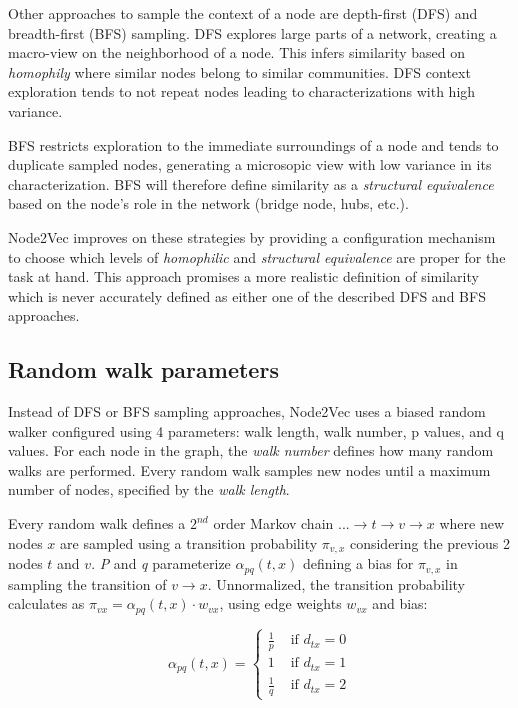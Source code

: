 \documentclass[a4paper,10pt]{article}
\begin{document}
Other approaches to sample the context of a node are depth-first (DFS) and breadth-first (BFS) sampling. DFS explores large parts of a network, creating a macro-view on the neighborhood of a node. This infers similarity based on \textit{homophily} where similar nodes belong to similar communities. DFS context exploration tends to not repeat nodes leading to characterizations with high variance.

BFS restricts exploration to the immediate surroundings of a node and tends to duplicate sampled nodes, generating a microsopic view with low variance in its characterization. BFS will therefore define similarity as a \textit{structural equivalence} based on the node's role in the network (bridge node, hubs, etc.).

Node2Vec improves on these strategies by providing a configuration mechanism to choose which levels of \textit{homophilic} and \textit{structural equivalence} are proper for the task at hand. This approach promises a more realistic definition of similarity which is never accurately defined as either one of the described DFS and BFS approaches.

\subsection{Random walk parameters}

Instead of DFS or BFS sampling approaches, Node2Vec uses a biased random walker configured using 4 parameters: walk length, walk number, p values, and q values. For each  node in the graph, the \textit{walk number} defines how many random walks are performed. Every random walk samples new nodes until a maximum number of nodes, specified by the \textit{walk length}.

Every random walk defines a $2^{nd}$ order Markov chain $... \to t \to v \to x$ where new nodes $x$ are sampled using a transition probability $\pi_{v,x}$ considering the previous 2 nodes $t$ and $v$. \textit{P} and \textit{q} parameterize $\alpha_{p q}(t, x)$ defining a bias for $\pi_{v,x}$ in sampling the transition of $v \to x$. Unnormalized, the transition probability calculates as $\pi_{v x}=\alpha_{pq}(t, x) \cdot w_{vx}$, using edge weights $w_{vx}$ and bias:

$$
\alpha_{p q}(t, x)=\left\{\begin{array}{ll}
\frac{1}{p} & \text { if } d_{t x}=0 \\
1 & \text { if } d_{t x}=1 \\
\frac{1}{q} & \text { if } d_{t x}=2
\end{array}\right.
$$
\end{document}
